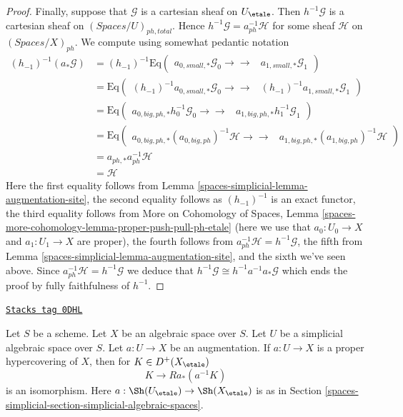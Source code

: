 \begin{proof}
\medskip\noindent
Finally, suppose that $\mathcal{G}$ is a cartesian sheaf on $U_\etale$.
Then $h^{-1}\mathcal{G}$ is a cartesian sheaf on
$(\textit{Spaces}/U)_{ph, total}$.
Hence $h^{-1}\mathcal{G} = a_{ph}^{-1}\mathcal{H}$ for some sheaf
$\mathcal{H}$ on $(\textit{Spaces}/X)_{ph}$.
We compute using somewhat pedantic notation
\begin{align*}
(h_{-1})^{-1}(a_*\mathcal{G})
& =
(h_{-1})^{-1}
\text{Eq}(
\begin{array}{cc}a_{0, small, *}\mathcal{G}_0
\longrightarrow\longrightarrow & a_{1, small, *}\mathcal{G}_1\end{array}
) \\
& =
\text{Eq}(
\begin{array}{cc}(h_{-1})^{-1}a_{0, small, *}\mathcal{G}_0
\longrightarrow\longrightarrow & (h_{-1})^{-1}a_{1, small, *}\mathcal{G}_1\end{array}
) \\
& =
\text{Eq}(
\begin{array}{cc}a_{0, big, ph, *}h_0^{-1}\mathcal{G}_0
\longrightarrow\longrightarrow & a_{1, big, ph, *}h_1^{-1}\mathcal{G}_1\end{array}
) \\
& =
\text{Eq}(
\begin{array}{cc}a_{0, big, ph, *}(a_{0, big, ph})^{-1}\mathcal{H}
\longrightarrow\longrightarrow & a_{1, big, ph, *}(a_{1, big, ph})^{-1}\mathcal{H}\end{array}
) \\
& =
a_{ph, *}a_{ph}^{-1}\mathcal{H} \\
& =
\mathcal{H}
\end{align*}
Here the first equality follows from Lemma \ref{spaces-simplicial-lemma-augmentation-site},
the second equality follows as $(h_{-1})^{-1}$ is an exact functor,
the third equality follows from
More on Cohomology of Spaces, Lemma
\ref{spaces-more-cohomology-lemma-proper-push-pull-ph-etale}
(here we use that $a_0 : U_0 \to X$ and $a_1: U_1 \to X$ are proper),
the fourth follows from $a_{ph}^{-1}\mathcal{H} = h^{-1}\mathcal{G}$,
the fifth from Lemma \ref{spaces-simplicial-lemma-augmentation-site}, and the
sixth we've seen above. Since $a_{ph}^{-1}\mathcal{H} = h^{-1}\mathcal{G}$
we deduce that $h^{-1}\mathcal{G} \cong h^{-1}a^{-1}a_*\mathcal{G}$
which ends the proof by fully faithfulness of $h^{-1}$.
\end{proof}

\begin{lemma}
\label{spaces-simplicial-lemma-cohomological-descent-for-ph-hypercovering}
\href{https://stacks.math.columbia.edu/tag/0DHL}{\texttt{Stacks tag 0DHL}}

Let $S$ be a scheme. Let $X$ be an algebraic space over $S$.
Let $U$ be a simplicial algebraic space over $S$. Let $a : U \to X$
be an augmentation. If $a : U \to X$ is a proper hypercovering of $X$,
then for $K \in D^+(X_\etale)$
$$
K \to Ra_*(a^{-1}K)
$$
is an isomorphism. Here $a : \Sh(U_\etale) \to \Sh(X_\etale)$
is as in Section \ref{spaces-simplicial-section-simplicial-algebraic-spaces}.
\end{lemma}

